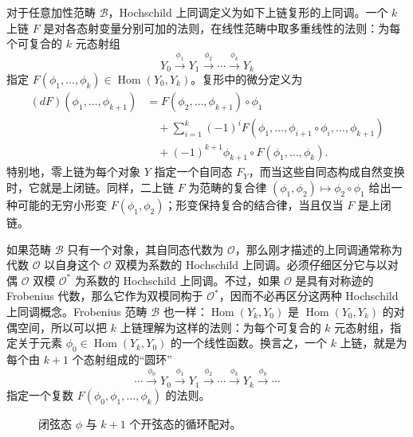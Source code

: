 对于任意加性范畴 $\mathcal{B}$，Hochschild 上同调定义为如下上链复形的上同调。一个 $k$ 上链 $F$ 是对各态射变量分别可加的法则，在线性范畴中取多重线性的法则：为每个可复合的 $k$ 元态射组
\begin{equation}\label{eq:2.44}
Y_0\xrightarrow{\phi_1}Y_1\xrightarrow{\phi_2}\cdots\xrightarrow{\phi_k}Y_k
\end{equation}
指定 $F(\phi_1,\ldots,\phi_k)\in\operatorname{Hom}(Y_0,Y_k)$。复形中的微分定义为
\begin{equation}\label{eq:2.45}
\begin{aligned}
(dF)(\phi_1,\ldots,\phi_{k+1})
&=F(\phi_2,\ldots,\phi_{k+1})\circ\phi_1\\
&\quad+\sum_{i=1}^k(-1)^iF(\phi_1,\ldots,\phi_{i+1}\circ\phi_i,\ldots,\phi_{k+1})\\
&\quad+(-1)^{k+1}\phi_{k+1}\circ F(\phi_1,\ldots,\phi_k).
\end{aligned}
\end{equation}
特别地，零上链为每个对象 $Y$ 指定一个自同态 $F_Y$，而当这些自同态构成自然变换时，它就是上闭链。同样，二上链 $F$ 为范畴的复合律 $(\phi_1,\phi_2)\mapsto\phi_2\circ\phi_1$ 给出一种可能的无穷小形变 $F(\phi_1,\phi_2)$；形变保持复合的结合律，当且仅当 $F$ 是上闭链。

如果范畴 $\mathcal{B}$ 只有一个对象，其自同态代数为 $\mathcal{O}$，那么刚才描述的上同调通常称为代数 $\mathcal{O}$ 以自身这个 $\mathcal{O}$ 双模为系数的 Hochschild 上同调。必须仔细区分它与以对偶 $\mathcal{O}$ 双模 $\mathcal{O}^*$ 为系数的 Hochschild 上同调。不过，如果 $\mathcal{O}$ 是具有对称迹的 Frobenius 代数，那么它作为双模同构于 $\mathcal{O}^*$，因而不必再区分这两种 Hochschild 上同调概念。Frobenius 范畴 $\mathcal{B}$ 也一样：$\operatorname{Hom}(Y_k,Y_0)$ 是 $\operatorname{Hom}(Y_0,Y_k)$ 的对偶空间，所以可以把 $k$ 上链理解为这样的法则：为每个可复合的 $k$ 元态射组，指定关于元素 $\phi_0\in\operatorname{Hom}(Y_k,Y_0)$ 的一个线性函数。换言之，一个 $k$ 上链，就是为每个由 $k+1$ 个态射组成的“圆环”
\begin{equation}\label{eq:2.46}
\cdots\xrightarrow{\phi_0}Y_0\xrightarrow{\phi_1}Y_1\xrightarrow{\phi_2}\cdots\xrightarrow{\phi_k}Y_k\xrightarrow{\phi_0}\cdots
\end{equation}
指定一个复数 $F(\phi_0,\phi_1,\ldots,\phi_k)$ 的法则。

\begin{figure}[H]
\centering
{}
\caption{闭弦态 $\phi$ 与 $k+1$ 个开弦态的循环配对。}\label{fig:2.13}
\end{figure}

